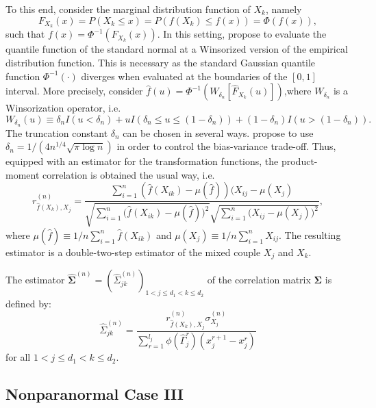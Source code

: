 To this end, consider the marginal distribution function of $X_k$, namely \[F_{X_k}(x)=P(X_k \leq x) = P(f(X_k) \leq f(x)) = \Phi(f(x)),\] such that $f(x) = \Phi^{-1}(F_{X_k}(x))$. In this setting, \citet{Liu09} propose to evaluate the quantile function of the standard normal at a Winsorized version of the empirical distribution function. This is necessary as the standard Gaussian quantile function $\Phi^{-1}(\cdot)$ diverges when evaluated at the boundaries of the $[0,1]$ interval. More precisely, consider $\hat{f}(u) = \Phi^{-1}(W_{\delta_n}[\hat{F}_{X_k}(u)])$,where $W_{\delta_n}$ is a Winsorization operator, i.e. \[W_{\delta_n}(u) \equiv \delta_n I(u < \delta_n) + u I(\delta_n \leq u \leq (1-\delta_n)) + (1-\delta_n) I(u > (1-\delta_n)).\] The truncation constant $\delta_n$ can be chosen in several ways.
\citet{Liu09} propose to use $\delta_n = 1/(4n^{1/4}\sqrt{\pi\log n})$ in order to control the bias-variance trade-off.
Thus, equipped with an estimator for the transformation functions, the product-moment correlation is obtained the usual way, i.e.
\begin{equation*}
    r^{(n)}_{\hat{f}(X_k),X_j} = \frac{\sum_{i=1}^n (\hat{f}(X_{ik}) - \mu(\hat{f}))(X_{ij} - \mu(X_j)}{\sqrt{\sum_{i=1}^n \Big(\hat{f}(X_{ik}) - \mu(\hat{f})\Big)^2}\sqrt{\sum_{i=1}^n \Big(X_{ij} - \mu(X_j)\Big)^2}},
\end{equation*}
where $\mu(\hat{f}) \equiv 1/n\sum_{i=1}^n \hat{f}(X_{ik})$ and $\mu(X_j) \equiv 1/n\sum_{i=1}^n X_{ij}$. The resulting estimator is a double-two-step estimator of the mixed couple $X_j$ and $X_k$.
\begin{definition}
    The estimator $\hat{\mathbf{\Sigma}}^{(n)} = (\hat{\Sigma}_{jk}^{(n)})_{1 < j \leq d_1 < k \leq d_2}$ of the correlation matrix $\mathbf{\Sigma}$ is defined by:
    \begin{equation}
        \hat{\Sigma}_{jk}^{(n)} = \frac{r^{(n)}_{\hat{f}(X_k),X_j} \sigma^{(n)}_{X_j}}{\sum_{r=1}^{l_{j}} \phi(\hat{\Gamma}_j^r)(x_j^{r+1} - x_j^r)}
    \end{equation}
    for all $1 < j \leq d_1 < k \leq d_2$.
\end{definition}



\subsection{Nonparanormal Case III}\label{sec::nonparanormal_case3}

